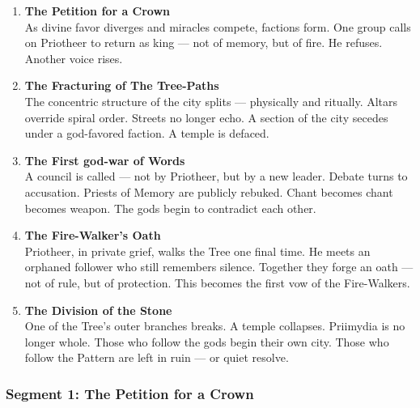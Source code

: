 \documentclass[9pt]{article}
\begin{document}
\vspace{1in}


\begin{center}
\begin{enumerate}
    \item \textbf{The Petition for a Crown} \\
    As divine favor diverges and miracles compete, factions form. One group calls on Priotheer to return as king — not of memory, but of fire. He refuses. Another voice rises.

    \vspace{1in}
    \item \textbf{The Fracturing of The Tree-Paths} \\
       The concentric structure of the city splits — physically and ritually. Altars override spiral order. Streets no longer echo. A section of the city secedes under a god-favored faction. A temple is defaced.
    \vspace{1in}
    \item \textbf{The First god-war of Words} \\
      A council is called — not by Priotheer, but by a new leader. Debate turns to accusation. Priests of Memory are publicly rebuked. Chant becomes chant becomes weapon. The gods begin to contradict each other.
    \vspace{1in}
    \item \textbf{The Fire-Walker's Oath} \\
    Priotheer, in private grief, walks the Tree one final time. He meets an orphaned follower who still remembers silence. Together they forge an oath — not of rule, but of protection. This becomes the first vow of the Fire-Walkers.

    \vspace{1in}
    \item \textbf{The Division of the Stone} \\
    One of the Tree’s outer branches breaks. A temple collapses. Priimydia is no longer whole. Those who follow the gods begin their own city. Those who follow the Pattern are left in ruin — or quiet resolve.

\end{enumerate}
\end{center}

\newpage

\subsubsection*{Segment 1: The Petition for a Crown}
\end{document}
